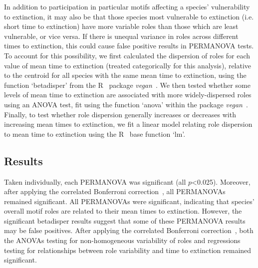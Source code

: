 \documentclass[12pt]{article}
\begin{document}
\begin{spacing}{2.0}
        
        In addition to participation in particular motifs affecting a species' vulnerability to extinction, it may also be that those species most vulnerable to extinction (i.e. short time to extinction) have more variable roles than those which are least vulnerable, or vice versa. 
        If there is unequal variance in roles across different times to extinction, this could cause false positive results in PERMANOVA tests.
        To account for this possibility, we first calculated the dispersion of roles for each value of mean time to extinction (treated categorically for this analysis), relative to the centroid for all species with the same mean time to extinction, using the function `betadisper' from the R~\citep{R} package \emph{vegan}~\citep{vegan}.
        We then tested whether some levels of mean time to extinction are associated with more widely-dispersed roles using an ANOVA test, fit using the function `anova' within the package \emph{vegan}~\citep{vegan}.
        Finally, to test whether role dispersion generally increases or decreases with increasing mean times to extinction, we fit a linear model relating role dispersion to mean time to extinction using the R~\citep{R} base function `lm'.


	\subsection*{Results}


		Taken individually, each PERMANOVA was significant (all $p$\textless0.025). Moreover, after applying the correlated Bonferroni correction~\citep{Drezner2016}, all PERMANOVAs remained significant.
		All PERMANOVAs were significant, indicating that species' overall motif roles are related to their mean times to extinction.
		However, the significant betadisper results suggest that some of these PERMANOVA results may be false positives.
		After applying the correlated Bonferroni correction~\citep{Drezner2016}, both the ANOVAs testing for non-homogeneous variability of roles and regressions testing for relationships between role variability and time to extinction remained significant.



\end{spacing}
\end{document}
